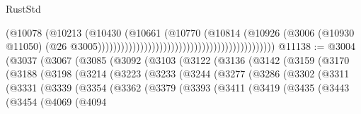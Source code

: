 \begin{lexlean}{RustStd}
\begin{coremodule}
                                                                              (@10078
                                                                                (@10213
                                                                                  (@10430
                                                                                    (@10661
                                                                                      (@10770
                                                                                        (@10814
                                                                                          (@10926
                                                                                            (@3006
                                                                                              (@10930
                                                                                                @11050)
                                                                                              (@26
                                                                                                @3005))))))))))))))))))))))))))))))))))))))))))))))
@11138 := @3004
    (@3037
      (@3067
        (@3085
          (@3092
            (@3103
              (@3122
                (@3136
                  (@3142
                    (@3159
                      (@3170
                        (@3188
                          (@3198
                            (@3214
                              (@3223
                                (@3233
                                  (@3244
                                    (@3277
                                      (@3286
                                        (@3302
                                          (@3311
                                            (@3331
                                              (@3339
                                                (@3354
                                                  (@3362
                                                    (@3379
                                                      (@3393
                                                        (@3411
                                                          (@3419
                                                            (@3435
                                                              (@3443
                                                                (@3454
                                                                  (@4069
                                                                    (@4094

\end{coremodule}
\end{lexlean}
